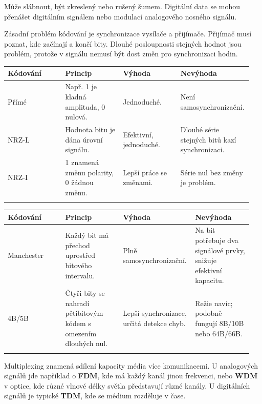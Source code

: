 Může slábnout, být zkreslený nebo rušený šumem. Digitální data se mohou přenášet digitálním signálem nebo modulací analogového nosného signálu.

Zásadní problém kódování je synchronizace vysílače a přijímače. Přijímač musí poznat, kde začínají a končí bity. Dlouhé posloupnosti stejných hodnot jsou problém, protože v signálu nemusí být dost změn pro synchronizaci hodin.

\begin{longtable}{p{0.237\linewidth}p{0.237\linewidth}p{0.237\linewidth}p{0.237\linewidth}}
\toprule
\textbf{Kódování} & \textbf{Princip} & \textbf{Výhoda} & \textbf{Nevýhoda} \\
\midrule\endhead
Přímé & Např. 1 je kladná amplituda, 0 nulová. & Jednoduché. & Není samosynchronizační. \\
\addlinespace
NRZ-L & Hodnota bitu je dána úrovní signálu. & Efektivní, jednoduché. & Dlouhé série stejných bitů kazí synchronizaci. \\
\addlinespace
NRZ-I & 1 znamená změnu polarity, 0 žádnou změnu. & Lepší práce se změnami. & Série nul bez změny je problém. \\
\addlinespace
\bottomrule
\end{longtable}

\begin{longtable}{p{0.237\linewidth}p{0.237\linewidth}p{0.237\linewidth}p{0.237\linewidth}}
\toprule
\textbf{Kódování} & \textbf{Princip} & \textbf{Výhoda} & \textbf{Nevýhoda} \\
\midrule\endhead
Manchester & Každý bit má přechod uprostřed bitového intervalu. & Plně samosynchronizační. & Na bit potřebuje dva signálové prvky, snižuje efektivní kapacitu. \\
\addlinespace
4B/5B & Čtyři bity se nahradí pětibitovým kódem s omezením dlouhých nul. & Lepší synchronizace, určitá detekce chyb. & Režie navíc; podobně fungují 8B/10B nebo 64B/66B. \\
\addlinespace
\bottomrule
\end{longtable}


Multiplexing znamená sdílení kapacity média více komunikacemi. U analogových signálů jde například o \textbf{FDM}, kde má každý kanál jinou frekvenci, nebo \textbf{WDM} v optice, kde různé vlnové délky světla představují různé kanály. U digitálních signálů je typické \textbf{TDM}, kde se médium rozděluje v čase.

